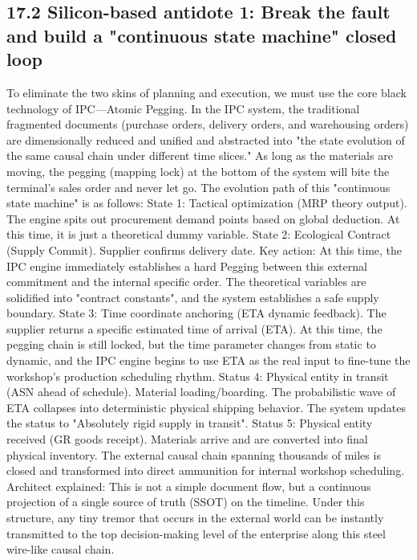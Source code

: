 \documentclass[11pt,a4paper]{article}
\begin{document}
\subsection*{17.2 Silicon-based antidote 1: Break the fault and build a "continuous state machine" closed loop}


To eliminate the two skins of planning and execution, we must use the core black technology of IPC—Atomic Pegging. In the IPC system, the traditional fragmented documents (purchase orders, delivery orders, and warehousing orders) are dimensionally reduced and unified and abstracted into "the state evolution of the same causal chain under different time slices." As long as the materials are moving, the pegging (mapping lock) at the bottom of the system will bite the terminal's sales order and never let go. The evolution path of this "continuous state machine" is as follows: State 1: Tactical optimization (MRP theory output). The engine spits out procurement demand points based on global deduction. At this time, it is just a theoretical dummy variable. State 2: Ecological Contract (Supply Commit). Supplier confirms delivery date. Key action: At this time, the IPC engine immediately establishes a hard Pegging between this external commitment and the internal specific order. The theoretical variables are solidified into "contract constants", and the system establishes a safe supply boundary. State 3: Time coordinate anchoring (ETA dynamic feedback). The supplier returns a specific estimated time of arrival (ETA). At this time, the pegging chain is still locked, but the time parameter changes from static to dynamic, and the IPC engine begins to use ETA as the real input to fine-tune the workshop's production scheduling rhythm. Status 4: Physical entity in transit (ASN ahead of schedule). Material loading/boarding. The probabilistic wave of ETA collapses into deterministic physical shipping behavior. The system updates the status to "Absolutely rigid supply in transit". Status 5: Physical entity received (GR goods receipt). Materials arrive and are converted into final physical inventory. The external causal chain spanning thousands of miles is closed and transformed into direct ammunition for internal workshop scheduling. Architect explained: This is not a simple document flow, but a continuous projection of a single source of truth (SSOT) on the timeline. Under this structure, any tiny tremor that occurs in the external world can be instantly transmitted to the top decision-making level of the enterprise along this steel wire-like causal chain.
\end{document}

